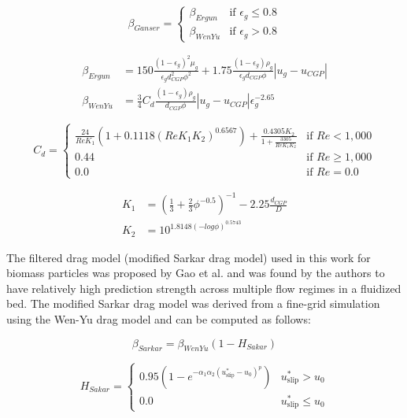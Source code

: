 \begin{equation}
    \beta_{Ganser} =
    \begin{cases}
        \beta_{Ergun} & \text{if } \epsilon_g \leq 0.8 \\
        \beta_{WenYu} & \text{if } \epsilon_g > 0.8
    \end{cases}
\end{equation}

\begin{align}
    \beta_{Ergun} &= 150 \frac{(1 - \epsilon_g)^2 \mu_g}{\epsilon_g d^2_{CGP} \phi^2} + 1.75 \frac{(1 - \epsilon_g) \rho_g}{\epsilon_g d_{CGP} \phi} |u_g - u_{CGP}| \\
    \beta_{WenYu} &= \frac{3}{4} C_d \frac{(1 - \epsilon_g) \rho_g}{d_{CGP} \phi} |u_g - u_{CGP}| \epsilon_g^{-2.65}
\end{align}

\begin{equation}
    C_d =
    \begin{cases}
        \frac{24}{Re K_1} (1 + 0.1118(Re K_1 K_2)^{0.6567}) + \frac{0.4305 K_2}{1 + \frac{3305}{Re K_1 K_2}} & \text{if } Re < 1,000 \\
        0.44 & \text{if } Re \geq 1,000 \\
        0.0 & \text{if } Re = 0.0
    \end{cases}
\end{equation}

\begin{align}
    K_1 &= \left(\frac{1}{3} + \frac{2}{3} \phi^{-0.5} \right)^{-1} - 2.25 \frac{d_{CGP}}{D} \\
    K_2 &= 10^{1.8148 (-log \phi)^{0.5743}}
\end{align}

The filtered drag model (modified Sarkar drag model) used in this work for biomass particles was proposed by Gao et al. \cite{Gao-2018} and was found by the authors to have relatively high prediction strength across multiple flow regimes in a fluidized bed. The modified Sarkar drag model was derived from a fine-grid simulation using the Wen-Yu drag model and can be computed as follows:

\begin{equation}
    \beta_{Sarkar} = \beta_{WenYu} (1 - H_{Sakar})
\end{equation}

\begin{equation}
    H_{Sakar} =
    \begin{cases}
        0.95 \left(1 - e^{-\alpha_1 \alpha_2 (u_{\text{slip}}^* - u_0)^p} \right) & u_{\text{slip}}^* > u_0 \\
        0.0 & u_{\text{slip}}^* \leq u_0
    \end{cases}
\end{equation}

